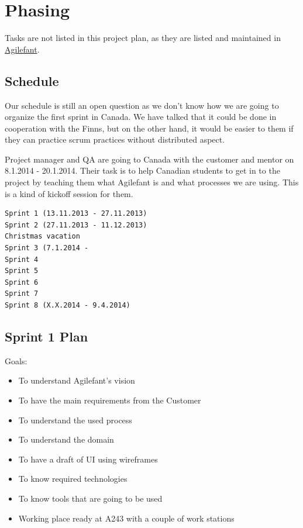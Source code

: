 \section{Phasing}

Tasks are not listed in this project plan, as they are listed and maintained in 
\href{https://cloud.agilefant.com/dev/}{Agilefant}.

\subsection{Schedule}

Our schedule is still an open question as we don't know how we are going to
organize the first sprint in Canada. We have talked that it could be done in
cooperation with the Finns, but on the other hand, it would be easier to them if
they can practice scrum practices without distributed aspect.

Project manager and QA are going to Canada with the customer and mentor on
8.1.2014 - 20.1.2014. Their task is to help Canadian students to get in to the
project by teaching them what Agilefant is and what processes we are using. This
is a kind of kickoff session for them.

\begin{verbatim}
Sprint 1 (13.11.2013 - 27.11.2013)
Sprint 2 (27.11.2013 - 11.12.2013)
Christmas vacation
Sprint 3 (7.1.2014 - 
Sprint 4
Sprint 5
Sprint 6
Sprint 7
Sprint 8 (X.X.2014 - 9.4.2014) 
\end{verbatim}

\subsection{Sprint 1 Plan}

Goals:
\begin{itemize}
\item To understand Agilefant's vision
\item To have the main requirements from the Customer
\item To understand the used process
\item To understand the domain
\item To have a draft of UI using wireframes
\item To know required technologies
\item To know tools that are going to be used
\item Working place ready at A243 with a couple of work stations
\end{itemize}

